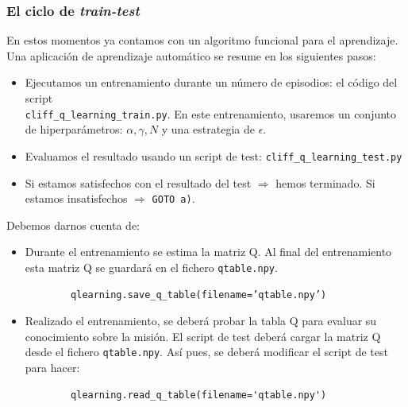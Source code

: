 \documentclass{article}
\begin{document}
\subsubsection{El ciclo de \textit{train-test}}
En estos momentos ya contamos con un algoritmo funcional para el aprendizaje. Una aplicación de aprendizaje automático se resume en los siguientes pasos:
\begin{itemize}
    \item[a)] Ejecutamos un entrenamiento durante un número de episodios: el código del script\\ \texttt{cliff\_q\_learning\_train.py}. En este entrenamiento, usaremos un conjunto de hiperparámetros: $\alpha, \gamma, N$ y una estrategia de $\epsilon$.
    \item[b)] Evaluamos el resultado usando un script de test: \texttt{cliff\_q\_learning\_test.py}
    \item[c)] Si estamos satisfechos con el resultado del test $\Longrightarrow$ hemos terminado. Si estamos insatisfechos $\Longrightarrow$ \texttt{GOTO a)}.
\end{itemize}

Debemos darnos cuenta de:
\begin{itemize}
    \item Durante el entrenamiento se estima la matriz Q. Al final del entrenamiento esta matriz Q se guardará en el fichero \texttt{qtable.npy}. 
    \begin{verbatim}
        qlearning.save_q_table(filename=’qtable.npy’)
    \end{verbatim}
     \item Realizado el entrenamiento, se deberá probar la tabla Q para evaluar su conocimiento sobre la misión. El script de test deberá cargar la matriz Q desde el fichero \texttt{qtable.npy}. Así pues, se deberá modificar el script de test para hacer:
     \begin{verbatim}
        qlearning.read_q_table(filename='qtable.npy')
     \end{verbatim}
\end{itemize}
\end{document}
